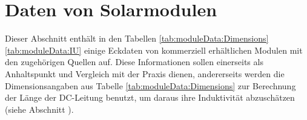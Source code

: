 \chapter{Daten von Solarmodulen}
\label{app:commercial:modules}

Dieser  Abschnitt enth\"alt  in  den Tabellen  \ref{tab:moduleData:Dimensions}
\ref{tab:moduleData:IU} einige Eckdaten von kommerziell erh\"altlichen Modulen
mit  den  zugeh\"origen  Quellen auf. Diese  Informationen  sollen  einerseits
als  Anhaltspunkt und  Vergleich mit  der Praxis  dienen, andererseits  werden
die   Dimensionsangaben   aus  Tabelle   \ref{tab:moduleData:Dimensions}   zur
Berechnung der L\"ange  der DC-Leitung benutzt, um  daraus ihre Induktivit\"at
abzusch\"atzen (siehe Abschnitt ).


